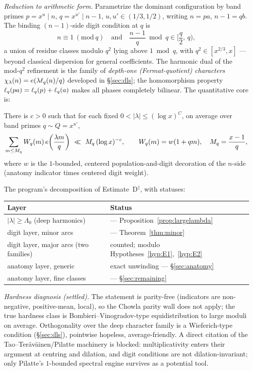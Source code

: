 \noindent\emph{Reduction to arithmetic form.} Parametrize the dominant
configuration by band primes $p=x^u\mid n$, $q=x^{u'}\mid n-1$,
$u,u'\in(1/3,1/2)$, writing $n=pa$, $n-1=qb$. The binding $(n-1)$-side
digit condition at $q$ is
\[
n\equiv1\ (\mathrm{mod}\ q)
\quad\text{and}\quad
\frac{n-1}{q}\bmod q\in\Big[\frac q2,\,q\Big),
\]
a union of residue classes modulo $q^2$ lying above $1\bmod q$, with
$q^2\in[x^{2/3},x]$ --- beyond classical dispersion for general
coefficients. The harmonic dual of the mod-$q^2$ refinement is the family
of \emph{depth-one (Fermat-quotient) characters}
$\chi_\lambda(n)=e\!\left(\lambda\ell_q(n)/q\right)$ developed in \S\ref{sec:dls}; the
homomorphism property $\ell_q(pa)=\ell_q(p)+\ell_q(a)$ makes all phases completely
bilinear. The quantitative core is:

\begin{estimate}\label{est:Ddagger}
\statusO\quad
There is $c>0$ such that for each fixed $0<|\lambda|\le(\log x)^{C}$, on
average over band primes $q\sim Q=x^{u'}$,
\[
\sum_{m\le M_q}W_q(m)\,e\!\left(\frac{\lambda m}{q}\right)\ \ll\ M_q\,(\log x)^{-c},
\qquad
W_q(m)=w(1+qm),\quad M_q=\frac{x-1}{q},
\]
where $w$ is the $1$-bounded, centered population-and-digit decoration of
the $n$-side (anatomy indicator times centered digit weight).
\end{estimate}

\noindent The program's decomposition of Estimate~D$^\dagger$, with
statuses:
\begin{center}
\begin{tabular}{ll}
\toprule
Layer & Status \\
\midrule
$|\lambda|\ge\Lambda_0$ (deep harmonics) &
\statusP{} --- Proposition~\ref{prop:largelambda} \\
digit layer, minor arcs & \statusP{} --- Theorem~\ref{thm:minor} \\
digit layer, major arcs (two families) &
counted; modulo Hypotheses~\ref{hyp:E1},~\ref{hyp:E2} \\
anatomy layer, generic & exact unwinding --- \S\ref{sec:anatomy} \\
anatomy layer, fine classes & \statusN{} --- \S\ref{sec:remaining} \\
\bottomrule
\end{tabular}
\end{center}

\noindent\emph{Hardness diagnosis (settled).} The statement is parity-free
(indicators are non-negative, positive-mean, local), so the Chowla parity
wall does not apply; the true hardness class is Bombieri--Vinogradov-type
equidistribution to large moduli on average. Orthogonality over the deep
character family is a Wieferich-type condition (\S\ref{sec:dls}),
pointwise hopeless, average-friendly. A direct citation of the
Tao--Ter\"av\"ainen/Pilatte machinery is blocked: multiplicativity enters
their argument at centring and dilation, and digit conditions are not
dilation-invariant; only Pilatte's $1$-bounded spectral engine survives as
a potential tool.

